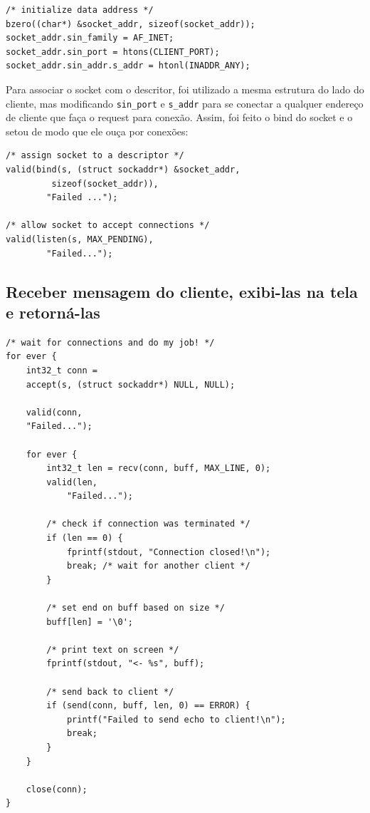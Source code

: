 \documentclass[10pt,twocolumn,letterpaper]{article}
\begin{document}
\begin{lstlisting}[caption={Inicialização de endereço e porta}, label=Algorithm]
/* initialize data address */
bzero((char*) &socket_addr, sizeof(socket_addr));
socket_addr.sin_family = AF_INET;
socket_addr.sin_port = htons(CLIENT_PORT);
socket_addr.sin_addr.s_addr = htonl(INADDR_ANY);
	\end{lstlisting}

Para associar o socket com o descritor, foi utilizado a mesma estrutura do lado do cliente, mas modificando \texttt{sin\_port} e \texttt{s\_addr} para se conectar a qualquer endereço de cliente que faça o request para conexão. Assim, foi feito o bind do socket e o setou de modo que ele ouça por conexões:

\begin{lstlisting}[caption={Binding e Listening do socket}, label=Algorithm]
/* assign socket to a descriptor */
valid(bind(s, (struct sockaddr*) &socket_addr, 
         sizeof(socket_addr)),
        "Failed ...");

/* allow socket to accept connections */
valid(listen(s, MAX_PENDING),
        "Failed...");
\end{lstlisting}

\subsection{Receber mensagem do cliente, exibi-las na tela e retorná-las}


\begin{lstlisting}[caption={Estabelecimento de conexão e recebimento de mensagens}, label=Algorithm]
/* wait for connections and do my job! */
for ever {
    int32_t conn = 
    accept(s, (struct sockaddr*) NULL, NULL);

    valid(conn, 
    "Failed...");

    for ever {
        int32_t len = recv(conn, buff, MAX_LINE, 0);
        valid(len, 
            "Failed...");

        /* check if connection was terminated */
        if (len == 0) {
            fprintf(stdout, "Connection closed!\n");
            break; /* wait for another client */
        }

        /* set end on buff based on size */
        buff[len] = '\0';

        /* print text on screen */
        fprintf(stdout, "<- %s", buff);

        /* send back to client */
        if (send(conn, buff, len, 0) == ERROR) {
            printf("Failed to send echo to client!\n");
            break;
        }
    }

    close(conn);
}
	\end{lstlisting}
\end{document}

